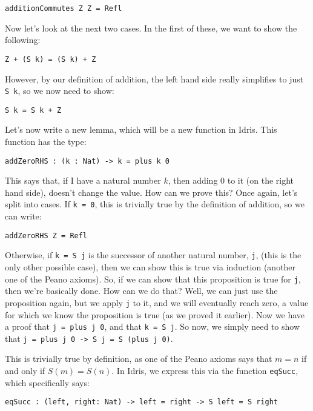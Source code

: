 \documentclass{article}
\newcommand{\inline}[1]{\texttt{#1}}
\begin{document}
\begin{verbatim}
additionCommutes Z Z = Refl
\end{verbatim}

Now let’s look at the next two cases. In the first of these, we want to show the following:
\begin{verbatim}
Z + (S k) = (S k) + Z
\end{verbatim}

However, by our definition of addition, the left hand side really simplifies to just \inline{S k}, so we now need to show:

\begin{verbatim}
S k = S k + Z
\end{verbatim}

Let’s now write a new lemma, which will be a new function in Idris.
This function has the type:

\begin{verbatim}
addZeroRHS : (k : Nat) -> k = plus k 0
\end{verbatim}

This says that, if I have a natural number $k$, then adding $0$ to it (on the right hand side), doesn’t change the value.
How can we prove this?
Once again, let’s split into cases.
If \inline{k = 0}, this is trivially true by the definition of addition, so we can write:

\begin{verbatim}
addZeroRHS Z = Refl
\end{verbatim}

Otherwise, if \inline{k = S j} is the successor of another natural number, \inline{j}, (this is the only other possible case), then we can show this is true via induction (another one of the Peano axioms).
So, if we can show that this proposition is true for \inline{j}, then we’re basically done.
How can we do that?
Well, we can just use the proposition again, but we apply \inline{j} to it, and we will eventually reach zero, a value for which we know the proposition is true (as we proved it earlier).
Now we have a proof that \inline{j = plus j 0}, and that \inline{k = S j}.
So now, we simply need to show that \inline{j = plus j 0 -> S j = S (plus j 0)}.

This is trivially true by definition, as one of the Peano axioms says that $m=n$ if and only if $S(m)=S(n)$.
In Idris, we express this via the function \inline{eqSucc}, which specifically says:

\begin{verbatim}
eqSucc : (left, right: Nat) -> left = right -> S left = S right
\end{verbatim}
\end{document}
